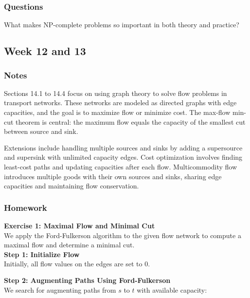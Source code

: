 \documentclass{article}
\theoremstyle{theorem}
\theoremstyle{definition}
\theoremstyle{remark}
\begin{document}
\subsubsection{Questions}

What makes NP-complete problems so important in both theory and practice?

\subsection{Week 12 and 13}

\subsubsection{Notes}

Sections 14.1 to 14.4 focus on using graph theory to solve flow problems in transport networks. These networks are modeled as directed graphs with edge capacities, and the goal is to maximize flow or minimize cost. The max-flow min-cut theorem is central: the maximum flow equals the capacity of the smallest cut between source and sink.

Extensions include handling multiple sources and sinks by adding a supersource and supersink with unlimited capacity edges. Cost optimization involves finding least-cost paths and updating capacities after each flow. Multicommodity flow introduces multiple goods with their own sources and sinks, sharing edge capacities and maintaining flow conservation.

\subsubsection{Homework}

\textbf{Exercise 1: Maximal Flow and Minimal Cut}\\
We apply the Ford-Fulkerson algorithm to the given flow network to compute a maximal flow and determine a minimal cut.\\

\textbf{Step 1: Initialize Flow}\\
Initially, all flow values on the edges are set to 0.

\textbf{Step 2: Augmenting Paths Using Ford-Fulkerson}\\
We search for augmenting paths from $s$ to $t$ with available capacity:
\end{document}

